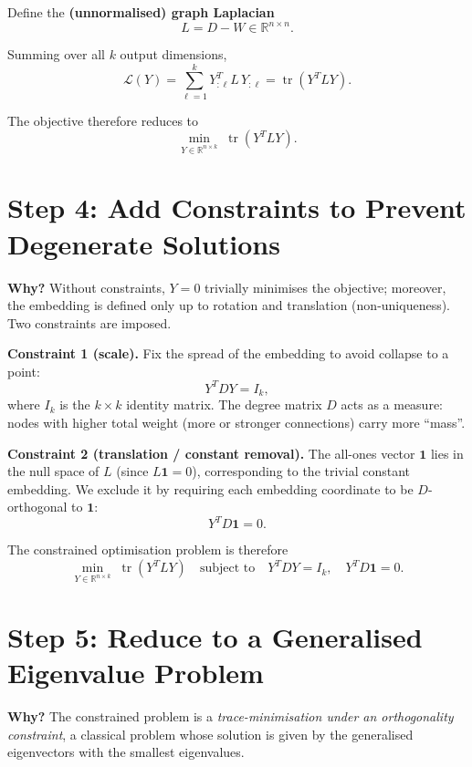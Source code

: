 \documentclass[11pt]{article}
\begin{document}
Define the \textbf{(unnormalised) graph Laplacian}
\[
  L = D - W \in \mathbb{R}^{n \times n}.
\]

Summing over all $k$ output dimensions,
\[
  \mathcal{L}(Y) = \sum_{\ell=1}^{k} Y_{:\ell}^T L\, Y_{:\ell} = \operatorname{tr}(Y^T L Y).
\]

The objective therefore reduces to
\[
  \min_{Y \in \mathbb{R}^{n\times k}}\; \operatorname{tr}(Y^T L Y).
\]

\section*{Step 4: Add Constraints to Prevent Degenerate Solutions}

\textbf{Why?} Without constraints, $Y = 0$ trivially minimises the
objective; moreover, the embedding is defined only up to rotation and
translation (non-uniqueness).  Two constraints are imposed.

\textbf{Constraint 1 (scale).}  Fix the spread of the embedding to
avoid collapse to a point:
\[
  Y^T D Y = I_k,
\]
where $I_k$ is the $k\times k$ identity matrix.  The degree matrix $D$
acts as a measure: nodes with higher total weight (more or stronger
connections) carry more ``mass''.

\textbf{Constraint 2 (translation / constant removal).}  The
all-ones vector $\mathbf{1}$ lies in the null space of $L$ (since
$L\mathbf{1}=0$), corresponding to the trivial constant embedding.
We exclude it by requiring each embedding coordinate to be
$D$-orthogonal to $\mathbf{1}$:
\[
  Y^T D \mathbf{1} = 0.
\]

The constrained optimisation problem is therefore
\[
  \min_{Y \in \mathbb{R}^{n\times k}}\; \operatorname{tr}(Y^T L Y)
  \quad \text{subject to} \quad Y^T D Y = I_k, \quad Y^T D\mathbf{1} = 0.
\]

\section*{Step 5: Reduce to a Generalised Eigenvalue Problem}

\textbf{Why?} The constrained problem is a \emph{trace-minimisation
under an orthogonality constraint}, a classical problem whose solution
is given by the generalised eigenvectors with the smallest eigenvalues.
\end{document}
